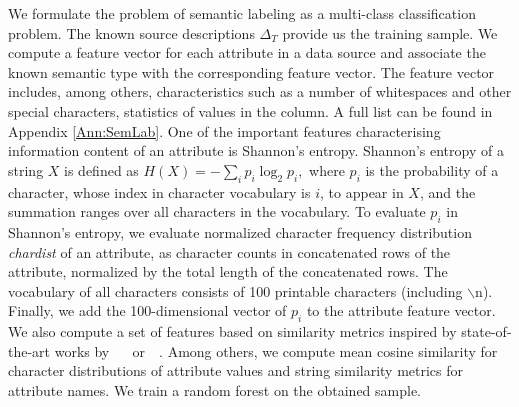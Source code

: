 \documentclass[letterpaper]{article} %
\newcommand{\authornote}[3]{
  {\fbox{\sc 
  #1}:$\blacktriangleright$\textcolor{#2}{\small{#3}}$\blacktriangleleft$}%
}
\newcommand{\npr}[1]{\authornote{NPR}{orange}{#1}}
\newcommand{\ignore}[1]{}
\newcommand{\citeasnoun}[1]{\citeauthor{#1}~\shortcite{#1}}
\begin{document}
We formulate the problem of semantic labeling as a multi-class classification
problem.
The known source descriptions $\Delta_T$ provide us the training sample.
We compute a feature vector for each attribute in a data source and associate 
the known semantic type with the corresponding feature vector.
The feature vector includes, among others, characteristics
such as a number 
of whitespaces and other special characters, statistics of 
values in the column. 
A full list can be found in Appendix \ref{Ann:SemLab}.
One of the important features characterising information content of an attribute is Shannon's entropy.
Shannon's entropy 
 of a string $X$ is defined as
$H(X) = -\sum_{i}{p_i \log_{2}p_i},$ where $p_i$ is the probability of a character, whose index in character vocabulary is $i$, to appear in $X$, and the summation ranges over all
characters in the vocabulary.
To evaluate $p_i$ in Shannon's entropy, we evaluate normalized character frequency distribution \emph{chardist} of an attribute, as character counts in concatenated rows of the attribute, normalized by the total length of the concatenated rows.
The vocabulary of all characters consists of 100 printable characters (including $\backslash$n).
Finally, we add the 100-dimensional vector of $p_i$ to the attribute feature vector.
We also compute a set of features based on similarity metrics inspired by state-of-the-art works by ~\citeasnoun{Pham:semantic} or~\citeasnoun{Ritze:matching}.
Among others, we compute mean cosine similarity for character distributions of attribute values and string similarity metrics for attribute names.
We train a random forest on the obtained sample. 
\end{document}
